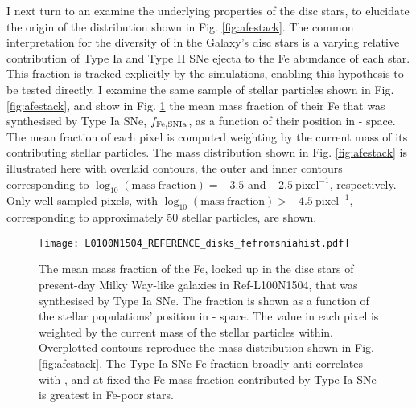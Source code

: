 I next turn to an examine the underlying properties of the disc stars, to elucidate the origin of the distribution shown in Fig. \ref{fig:afestack}. The common interpretation for the diversity of \afe{} in the Galaxy's disc stars is a varying relative contribution of Type Ia and Type II SNe ejecta to the Fe abundance of each star. This fraction is tracked explicitly by the simulations, enabling this hypothesis to be tested directly. I examine the same sample of stellar particles shown in Fig. \ref{fig:afestack}, and show in Fig. \ref{fig:afesniafrac} the mean mass fraction of their Fe that was synthesised by Type Ia SNe, $f_{\rm Fe,SNIa}$, as a function of their position in \afe{}-\feh{} space. The mean fraction of each pixel is computed weighting by the current mass of its contributing stellar particles. The mass distribution shown in Fig. \ref{fig:afestack} is illustrated here with overlaid contours, the outer and inner contours corresponding to $\log_{10}{(\mathrm{mass\ fraction})} = -3.5$ and $-2.5\ \mathrm{pixel^{-1}}$, respectively. Only well sampled pixels, with $\log_{10}{(\mathrm{mass\ fraction})} > -4.5\ \mathrm{pixel^{-1}}$, corresponding to approximately 50 stellar particles, are shown.

\begin{figure}
\texttt{[image: L0100N1504\_REFERENCE\_disks\_fefromsniahist.pdf]}
\caption[Two-dimensional histogram showing the mean mass fraction of stellar Fe which was ejected by Type Ia SNe, as a function of \afe{} and \feh{} for Ref-L100N1504 disc stars]{\label{fig:afesniafrac} The mean mass fraction of the Fe, locked up in the disc stars of present-day Milky Way-like galaxies in Ref-L100N1504, that was synthesised by Type Ia SNe. The fraction is shown as a function of the stellar populations' position in \afe{}-\feh{} space. The value in each  pixel is weighted by the current mass of the stellar particles within. Overplotted contours reproduce the mass distribution shown in Fig. \ref{fig:afestack}. The Type Ia SNe Fe fraction broadly anti-correlates with \afe{}, and at fixed \afe{} the Fe mass fraction contributed by Type Ia SNe is greatest in Fe-poor stars.}
\end{figure}

